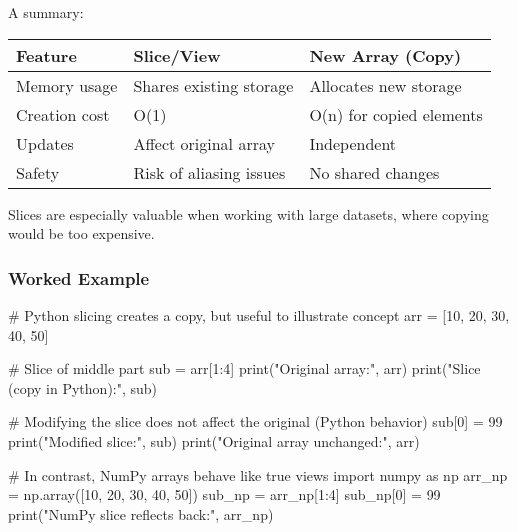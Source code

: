 \documentclass[
  letterpaper,
  DIV=11,
  numbers=noendperiod]{scrreprt}
\newenvironment{Shaded}{\begin{snugshade}}{\end{snugshade}}
\newcommand{\BuiltInTok}[1]{\textcolor[rgb]{0.00,0.23,0.31}{#1}}
\newcommand{\CommentTok}[1]{\textcolor[rgb]{0.37,0.37,0.37}{#1}}
\newcommand{\DecValTok}[1]{\textcolor[rgb]{0.68,0.00,0.00}{#1}}
\newcommand{\ImportTok}[1]{\textcolor[rgb]{0.00,0.46,0.62}{#1}}
\newcommand{\NormalTok}[1]{\textcolor[rgb]{0.00,0.23,0.31}{#1}}
\newcommand{\OperatorTok}[1]{\textcolor[rgb]{0.37,0.37,0.37}{#1}}
\newcommand{\StringTok}[1]{\textcolor[rgb]{0.13,0.47,0.30}{#1}}
\begin{document}
A summary:

\begin{longtable}[]{@{}lll@{}}
\toprule\noalign{}
Feature & Slice/View & New Array (Copy) \\
\midrule\noalign{}
\endhead
\bottomrule\noalign{}
\endlastfoot
Memory usage & Shares existing storage & Allocates new storage \\
Creation cost & O(1) & O(n) for copied elements \\
Updates & Affect original array & Independent \\
Safety & Risk of aliasing issues & No shared changes \\
\end{longtable}

Slices are especially valuable when working with large datasets, where
copying would be too expensive.

\subsubsection{Worked Example}\label{worked-example-4}

\begin{Shaded}
\begin{Highlighting}[]
\CommentTok{\# Python slicing creates a copy, but useful to illustrate concept}
\NormalTok{arr }\OperatorTok{=}\NormalTok{ [}\DecValTok{10}\NormalTok{, }\DecValTok{20}\NormalTok{, }\DecValTok{30}\NormalTok{, }\DecValTok{40}\NormalTok{, }\DecValTok{50}\NormalTok{]}

\CommentTok{\# Slice of middle part}
\NormalTok{sub }\OperatorTok{=}\NormalTok{ arr[}\DecValTok{1}\NormalTok{:}\DecValTok{4}\NormalTok{]}
\BuiltInTok{print}\NormalTok{(}\StringTok{"Original array:"}\NormalTok{, arr)}
\BuiltInTok{print}\NormalTok{(}\StringTok{"Slice (copy in Python):"}\NormalTok{, sub)}

\CommentTok{\# Modifying the slice does not affect the original (Python behavior)}
\NormalTok{sub[}\DecValTok{0}\NormalTok{] }\OperatorTok{=} \DecValTok{99}
\BuiltInTok{print}\NormalTok{(}\StringTok{"Modified slice:"}\NormalTok{, sub)}
\BuiltInTok{print}\NormalTok{(}\StringTok{"Original array unchanged:"}\NormalTok{, arr)}

\CommentTok{\# In contrast, NumPy arrays behave like true views}
\ImportTok{import}\NormalTok{ numpy }\ImportTok{as}\NormalTok{ np}
\NormalTok{arr\_np }\OperatorTok{=}\NormalTok{ np.array([}\DecValTok{10}\NormalTok{, }\DecValTok{20}\NormalTok{, }\DecValTok{30}\NormalTok{, }\DecValTok{40}\NormalTok{, }\DecValTok{50}\NormalTok{])}
\NormalTok{sub\_np }\OperatorTok{=}\NormalTok{ arr\_np[}\DecValTok{1}\NormalTok{:}\DecValTok{4}\NormalTok{]}
\NormalTok{sub\_np[}\DecValTok{0}\NormalTok{] }\OperatorTok{=} \DecValTok{99}
\BuiltInTok{print}\NormalTok{(}\StringTok{"NumPy slice reflects back:"}\NormalTok{, arr\_np)}
\end{Highlighting}
\end{Shaded}
\end{document}
